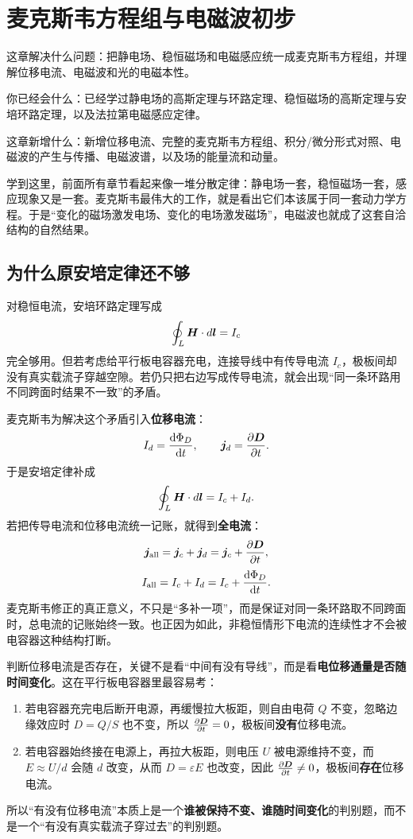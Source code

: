 \documentclass[lang=cn,11pt]{elegantbook}
\newcommand{\bridge}[1]{\begin{note}#1\end{note}}
\newcommand{\chapterroadmap}[3]{%
\begin{introduction}
  \item {\heiti 这章解决什么问题：}#1
  \item {\heiti 你已经会什么：}#2
  \item {\heiti 这章新增什么：}#3
\end{introduction}}
\begin{document}
\chapter{麦克斯韦方程组与电磁波初步}

\chapterroadmap
{把静电场、稳恒磁场和电磁感应统一成麦克斯韦方程组，并理解位移电流、电磁波和光的电磁本性。}
{已经学过静电场的高斯定理与环路定理、稳恒磁场的高斯定理与安培环路定理，以及法拉第电磁感应定律。}
{新增位移电流、完整的麦克斯韦方程组、积分/微分形式对照、电磁波的产生与传播、电磁波谱，以及场的能量流和动量。}

\bridge{学到这里，前面所有章节看起来像一堆分散定律：静电场一套，稳恒磁场一套，感应现象又是一套。麦克斯韦最伟大的工作，就是看出它们本该属于同一套动力学方程。于是“变化的磁场激发电场、变化的电场激发磁场”，电磁波也就成了这套自洽结构的自然结果。}

\section{为什么原安培定律还不够}

对稳恒电流，安培环路定理写成
\[
\oint_L \vb*{H}\cdot d\vb*{l}=I_c
\]
完全够用。但若考虑给平行板电容器充电，连接导线中有传导电流 \(I_c\)，极板间却没有真实载流子穿越空隙。若仍只把右边写成传导电流，就会出现“同一条环路用不同跨面时结果不一致”的矛盾。

麦克斯韦为解决这个矛盾引入\textbf{位移电流}：
\[
I_d=\dv{\Phi_D}{t},
\qquad
\vb*{j}_d=\pdv{\vb*{D}}{t}.
\]
于是安培定律补成
\[
\oint_L \vb*{H}\cdot d\vb*{l}=I_c+I_d.
\]
若把传导电流和位移电流统一记账，就得到\textbf{全电流}：
\[
\vb*{j}_{\mathrm{all}}=\vb*{j}_c+\vb*{j}_d
=\vb*{j}_c+\pdv{\vb*{D}}{t},
\]
\[
I_{\mathrm{all}}=I_c+I_d
=I_c+\dv{\Phi_D}{t}.
\]
麦克斯韦修正的真正意义，不只是“多补一项”，而是保证对同一条环路取不同跨面时，总电流的记账始终一致。也正因为如此，非稳恒情形下电流的连续性才不会被电容器这种结构打断。

\begin{note}
判断位移电流是否存在，关键不是看“中间有没有导线”，而是看\textbf{电位移通量是否随时间变化}。这在平行板电容器里最容易考：
\begin{enumerate}
  \item 若电容器充完电后断开电源，再缓慢拉大板距，则自由电荷 \(Q\) 不变，忽略边缘效应时 \(D=Q/S\) 也不变，所以 \(\pdv{\vb*{D}}{t}=0\)，极板间\textbf{没有}位移电流。
  \item 若电容器始终接在电源上，再拉大板距，则电压 \(U\) 被电源维持不变，而 \(E\approx U/d\) 会随 \(d\) 改变，从而 \(D=\varepsilon E\) 也改变，因此 \(\pdv{\vb*{D}}{t}\neq 0\)，极板间\textbf{存在}位移电流。
\end{enumerate}
所以“有没有位移电流”本质上是一个\textbf{谁被保持不变、谁随时间变化}的判别题，而不是一个“有没有真实载流子穿过去”的判别题。
\end{note}
\end{document}
